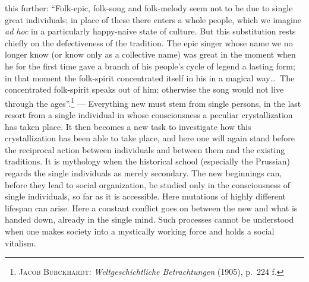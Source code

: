 \documentclass[12pt]{book}
\begin{document}
this further: ``Folk-epic, folk-song and folk-melody seem not to be due to single great
individuals; in place of these there enters a whole people, which we imagine \textit{ad
hoc} in a particularly happy-naive state of culture. But this substitution rests chiefly on
the defectiveness of the tradition. The epic singer whose name we no longer know (or know
only as a collective name) was great in the moment when he for the first time gave a branch
of his people's cycle of legend a lasting form; in that moment the folk-spirit concentrated
itself in his in a magical way\dots\ The concentrated folk-spirit speaks out of him;
otherwise the song would not live through the ages''.\footnote{\textsc{Jacob Burckhardt}:
\textit{Weltgeschichtliche Betrachtungen} (1905), p.\ 224 f.} --- Everything new must stem
from single persons, in the last resort from a single individual in whose consciousness a
peculiar crystallization has taken place. It then becomes a new task to investigate how
this crystallization has been able to take place, and here one will again stand before the
reciprocal action between individuals and between them and the existing traditions. It is
mythology when the historical school (especially the Prussian) regards the single
individuals as merely secondary. The new beginnings can, before they lead to social
organization, be studied only in the consciousness of single individuals, so far as it is
accessible. Here mutations of highly different lifespan can arise. Here a constant conflict
goes on between the new and what is handed down, already in the single mind. Such processes
cannot be understood when one makes society into a mystically working force and holds a
social vitalism.
\end{document}
